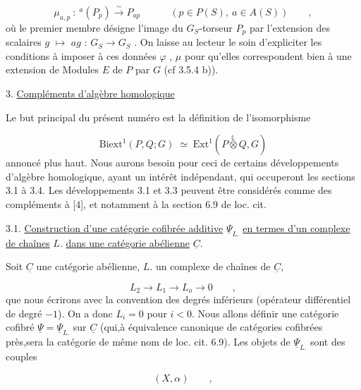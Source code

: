 \begin{equation*}
\mu_{a,p} \ :\ {}^a(P_p) \overset{\sim}{\longrightarrow} P_{ap} \qquad\quad (p \in P(S),\ a \in A(S)) \qquad ,
\end{equation*}
où le premier  membre désigne l'image du $G_S$-torseur $P_p$ par l'extension
des scalaires $g$ $\longmapsto$ $ag$ : $G_S \longrightarrow G_S$ . On laisse au lecteur le soin d'expliciter les conditions à imposer à ces données $\varphi$ , $\mu$ pour qu'elles correspondent bien à une extension de Modules $E$ de $P$ par $G$  (cf 3.5.4 b)).


3. \underline{Compléments d'algèbre homologique}

Le but principal du présent numéro est la définition de l'isomorphisme

\begin{equation*}
\mathrm{Biext}^1(P,Q;G) \;\simeq\; \mathrm{Ext}^1(P \overset{\mathbb{L}}{\otimes} Q,G)
\end{equation*}
annoncé plus haut. Nous aurons besoin pour ceci de certains développements d'algèbre homologique, ayant un intérêt indépendant, qui occuperont les sections 3.1  à 3.4. Les développements 3.1 et 3.3 peuvent être considérés comme des compléments à [4], et notamment à la section 6.9 de loc. cit.


3.1.  \underline{Construction d'une catégorie cofibrée additive} $\underline{\Psi}_{L.}$ \underline{en termes d'un complexe de chaînes} $L.$ \underline{dans une catégorie abélienne} $\underline{C}$.

Soit $\underline{C}$ une catégorie abélienne, $L.$ un complexe de chaînes de $\underline{C}$,

\begin{equation}\tag{3.1.1}
L_2 \longrightarrow L_1 \longrightarrow L_o \longrightarrow 0 \qquad ,
\end{equation}
que nous écrirons avec la convention des degrés inférieurs (opérateur différentiel de degré $-1$). On a donc $L_i = 0$ pour $i < 0$. Nous allons définir une catégorie cofibré $\underline{\Psi} = \underline{\Psi}_{L.}$ sur $\underline{C}$ (qui,à équivalence canonique de catégories cofibrées près,sera la catégorie de même nom de loc. cit. 6.9). Les objets de $\underline{\Psi}_{L.}$ sont des couples

\begin{equation*}
(X , \alpha) \qquad , 
\end{equation*}


